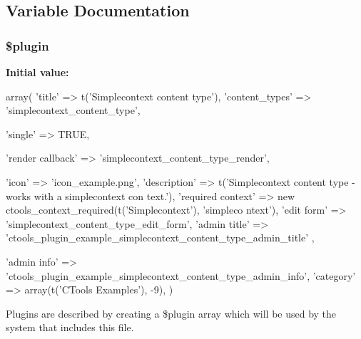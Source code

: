 \subsection{Variable Documentation}
\hypertarget{simplecontext__content__type_8inc_ada8a7130088351710bb02ed622d6bf65}{
\subsubsection[{\$plugin}]{\setlength{\rightskip}{0pt plus 5cm}\$plugin}}
\label{simplecontext__content__type_8inc_ada8a7130088351710bb02ed622d6bf65}
{\bfseries Initial value:}
\begin{DoxyCode}
 array(
  'title' => t('Simplecontext content type'),
  'content_types' => 'simplecontext_content_type',
  
  'single' => TRUE,
  
  'render callback' => 'simplecontext_content_type_render',

  
  'icon' => 'icon_example.png',
  'description' => t('Simplecontext content type - works with a simplecontext con
      text.'),
  'required context' => new ctools_context_required(t('Simplecontext'), 'simpleco
      ntext'),
  'edit form' => 'simplecontext_content_type_edit_form',
  'admin title' => 'ctools_plugin_example_simplecontext_content_type_admin_title'
      ,

  
  
  'admin info' => 'ctools_plugin_example_simplecontext_content_type_admin_info',
  'category' => array(t('CTools Examples'), -9),
)
\end{DoxyCode}
Plugins are described by creating a \$plugin array which will be used by the system that includes this file. 